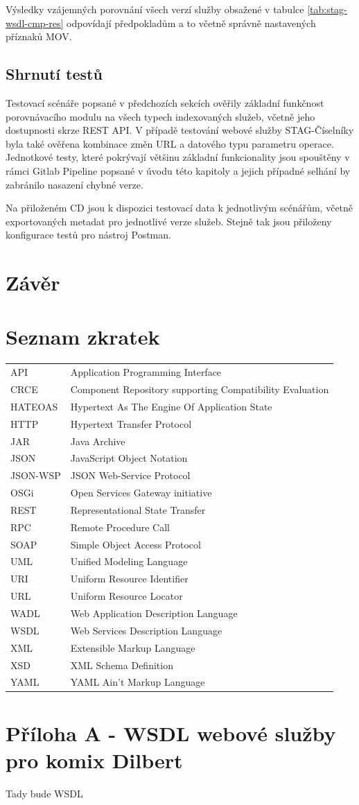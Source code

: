\documentclass[czech,DP]{thesiskiv}
\newcommand\nomenclature[2]{#1 & #2 \\}
\begin{document}
Výsledky vzájemných porovnání všech verzí služby obsažené v tabulce \ref{tab:stag-wsdl-cmp-res} odpovídají předpokladům a to včetně správně nastavených příznaků MOV.

\section{Shrnutí testů}

Testovací scénáře popsané v předchozích sekcích ověřily základní funkčnost porovnávacího modulu na všech typech indexovaných služeb, včetně jeho dostupnosti skrze REST API. V případě testování webové služby STAG-Číselníky byla také ověřena kombinace změn URL a datového typu parametru operace. Jednotkové testy, které pokrývají většinu základní funkcionality jsou spouštěny v rámci Gitlab Pipeline popsané v úvodu této kapitoly a jejich případné selhání by zabránilo nasazení chybné verze.

Na přiloženém CD jsou k dispozici testovací data k jednotlivým scénářům, včetně exportovaných metadat pro jednotlivé verze služeb. Stejně tak jsou přiloženy konfigurace testů pro nástroj Postman.


\chapter{Závěr}	

 
% 
%

{\raggedright\small

}

\chapter*{Seznam zkratek}

\begin{longtable}{@{}p{3cm}@{}p{\dimexpr\textwidth-1cm\relax}@{}}
	\nomenclature{API}{Application Programming Interface}
	\nomenclature{CRCE}{Component Repository supporting Compatibility Evaluation}
	\nomenclature{HATEOAS}{Hypertext As The Engine Of Application State}
	\nomenclature{HTTP}{Hypertext Transfer Protocol}
	\nomenclature{JAR}{Java Archive}
	\nomenclature{JSON}{JavaScript Object Notation}
	\nomenclature{JSON-WSP}{JSON Web-Service Protocol}
	\nomenclature{OSGi}{Open Services Gateway initiative}
	\nomenclature{REST}{Representational State Transfer}
	\nomenclature{RPC}{Remote Procedure Call}
	\nomenclature{SOAP}{Simple Object Access Protocol}
	\nomenclature{UML}{Unified Modeling Language}
	\nomenclature{URI}{Uniform Resource Identifier}
	\nomenclature{URL}{Uniform Resource Locator}
	\nomenclature{WADL}{Web Application Description Language}
	\nomenclature{WSDL}{Web Services Description Language}
	\nomenclature{XML}{Extensible Markup Language}
	\nomenclature{XSD}{XML Schema Definition}
	\nomenclature{YAML}{YAML Ain't Markup Language}
\end{longtable}

\chapter*{Příloha A - WSDL webové služby pro komix Dilbert}
Tady bude WSDL
\end{document}

